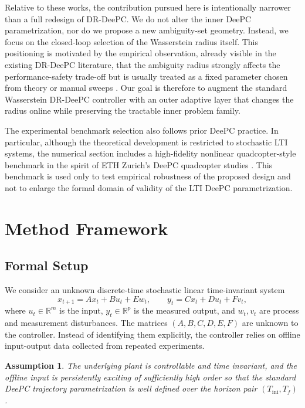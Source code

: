 \documentclass[conference]{IEEEtran}
\newtheorem{assumption}{Assumption}
\begin{document}
Relative to these works, the contribution pursued here is intentionally narrower than a full redesign of DR-DeePC. We do not alter the inner DeePC parametrization, nor do we propose a new ambiguity-set geometry. Instead, we focus on the closed-loop selection of the Wasserstein radius itself. This positioning is motivated by the empirical observation, already visible in the existing DR-DeePC literature, that the ambiguity radius strongly affects the performance-safety trade-off but is usually treated as a fixed parameter chosen from theory or manual sweeps \cite{Coulson2022DRCCDeePC}. Our goal is therefore to augment the standard Wasserstein DR-DeePC controller with an outer adaptive layer that changes the radius online while preserving the tractable inner problem family.

The experimental benchmark selection also follows prior DeePC practice. In particular, although the theoretical development is restricted to stochastic LTI systems, the numerical section includes a high-fidelity nonlinear quadcopter-style benchmark in the spirit of ETH Zurich's DeePC quadcopter studies \cite{Elokda2021Quadcopter}. This benchmark is used only to test empirical robustness of the proposed design and not to enlarge the formal domain of validity of the LTI DeePC parametrization.

\section{Method Framework}
\label{sec:method}

\subsection{Formal Setup}
We consider an unknown discrete-time stochastic linear time-invariant system \cite{Coulson2022DRCCDeePC}
\begin{equation}
x_{t+1} = A x_t + B u_t + E w_t, \qquad y_t = C x_t + D u_t + F v_t,
\end{equation}
where $u_t \in \mathbb{R}^{m}$ is the input, $y_t \in \mathbb{R}^{p}$ is the measured output, and $w_t,v_t$ are process and measurement disturbances. The matrices $(A,B,C,D,E,F)$ are unknown to the controller. Instead of identifying them explicitly, the controller relies on offline input-output data collected from repeated experiments.

\begin{assumption}
\label{ass:lti}
The underlying plant is controllable and time invariant, and the offline input is persistently exciting of sufficiently high order so that the standard DeePC trajectory parametrization is well defined over the horizon pair $(T_{\mathrm{ini}},T_f)$.
\end{assumption}
\end{document}
